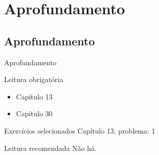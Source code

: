 \documentclass{beamer}
\begin{document}



\section{Aprofundamento}

\subsection{Aprofundamento}

\begin{frame}{Aprofundamento}
  \begin{block}{Leitura obrigatória}
    \begin{itemize}
    \item Capítulo 13
    \item Capítulo 30
    \end{itemize}
  \end{block}
  \begin{block}{Exercícios selecionados}
    \small
    Capítulo 13, problema: 1
  \end{block}
  \begin{block}{Leitura recomendada}
    \small
    Não há.
  \end{block}
\end{frame}
\end{document}
